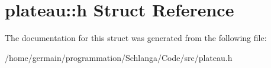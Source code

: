 \hypertarget{structplateau_1_1h}{\section{plateau\-:\-:h Struct Reference}
\label{structplateau_1_1h}
}


The documentation for this struct was generated from the following file\-:\begin{DoxyCompactItemize}
\item 
/home/germain/programmation/\-Schlanga/\-Code/src/plateau.\-h\end{DoxyCompactItemize}
